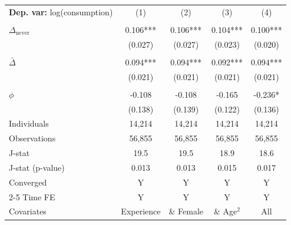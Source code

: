 \begin{tabular}{l cccc} \toprule  \textbf{Dep. var:}  log(consumption) 
                    &\multicolumn{1}{c}{(1)}   &\multicolumn{1}{c}{(2)}   &\multicolumn{1}{c}{(3)}   &\multicolumn{1}{c}{(4)}   \\
                    &               &               &               &               \\
\addlinespace
$\Delta_{\text{never}}$&       0.106***&       0.106***&       0.104***&       0.100***\\
                    &     (0.027)   &     (0.027)   &     (0.023)   &     (0.020)   \\
                    &               &               &               &               \\
\addlinespace
$\bar{\Delta}$      &       0.094***&       0.094***&       0.092***&       0.094***\\
                    &     (0.021)   &     (0.021)   &     (0.021)   &     (0.021)   \\
                    &               &               &               &               \\
\addlinespace
$\phi$              &      -0.108   &      -0.108   &      -0.165   &      -0.236*  \\
                    &     (0.138)   &     (0.139)   &     (0.122)   &     (0.136)   \\
\addlinespace
Individuals         &      14,214   &      14,214   &      14,214   &      14,214   \\
Observations        &      56,855   &      56,855   &      56,855   &      56,855   \\
J-stat              &        19.5   &        19.5   &        18.9   &        18.6   \\
J-stat (p-value)    &       0.013   &       0.013   &       0.015   &       0.017   \\
Converged           &           Y   &           Y   &           Y   &           Y   \\
\cmidrule{2-5} Time FE & Y & Y & Y & Y \\ Covariates & Experience & \& Female & \& Age$^2$ & All \\ \bottomrule \end{tabular}
